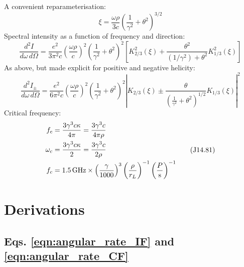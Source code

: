 \documentclass{book}
\begin{document}
A convenient reparameterisation:
\begin{equation}
    \xi = \frac{\omega\rho}{3c}\left(\frac{1}{\gamma^2} + \theta^2\right)^{3/2}
    \tag{J14.76}
\end{equation}
Spectral intensity as a function of frequency and direction:
\begin{equation}
    \frac{d^2I}{d\omega\,d\Omega} =
        \frac{e^2}{3\pi^2c}
        \left( \frac{\omega\rho}{c} \right)^2
        \left( \frac{1}{\gamma^2} + \theta^2 \right)^2
        \left[ K_{2/3}^2(\xi) + \frac{\theta^2}{(1/\gamma^2) + \theta^2} K_{1/3}^2(\xi) \right]
    \tag{J14.79}
\end{equation}
As above, but made explicit for positive and negative helicity:
\begin{equation}
    \frac{d^2I_\pm}{d\omega\,d\Omega} =
        \frac{e^2}{6\pi^2c}
        \left( \frac{\omega\rho}{c} \right)^2
        \left( \frac{1}{\gamma^2} + \theta^2 \right)^2
        \left| K_{2/3}(\xi) \pm \frac{\theta}{\left(\frac{1}{\gamma^2} + \theta^2\right)^{1/2}} K_{1/3}(\xi) \right|^2
    \tag{J Problem 14.25}
    \label{eqn:JP14_25}
\end{equation}
Critical frequency:
\begin{equation}
    \begin{aligned}
        f_c &= \frac{3\gamma^3 c\kappa}{4\pi}
             = \frac{3\gamma^3 c}{4\pi\rho} \\
        \omega_c &= \frac{3\gamma^3 c\kappa}{2}
                  = \frac{3\gamma^3 c}{2\rho} \\
        f_c &= 1.5\text{\,GHz} \times \left(\frac{\gamma}{1000}\right)^3 \left(\frac{\rho}{r_L}\right)^{-1} \left(\frac{P}{\text{s}}\right)^{-1}
    \end{aligned}
    \tag{J14.81}
\end{equation}

\appendix

\chapter{Derivations}

\section{Eqs. \eqref{eqn:angular_rate_IF} and \eqref{eqn:angular_rate_CF}}
\end{document}
